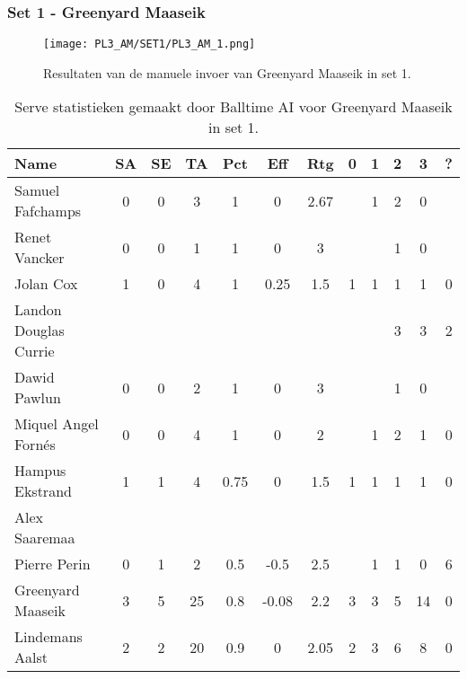 \subsubsection{Set 1 - Greenyard Maaseik}
\label{sec:PL3_Greenyard1}
\begin{figure}
  \centering
  \texttt{[image: PL3\_AM/SET1/PL3\_AM\_1.png]}
  \caption{\label{fig:PL3_AM_1}Resultaten van de manuele invoer van Greenyard Maaseik in set 1.}
\end{figure}

\begin{table}[ht!]
  \centering
  \scriptsize
  \begin{tabular}{|l|c|c|c|c|c|c|c|c|c|c|c|} \hline
    \textbf{Name} & SA & SE & TA & Pct & Eff & Rtg & 0 & 1 & 2 & 3 & ? \\ \hline
    Samuel Fafchamps & 0 & 0 & 3 & 1 & 0 & 2.67 &   & 1 & 2 & 0 &   \\
    Renet Vancker & 0 & 0 & 1 & 1 & 0 & 3 &   &   & 1 & 0 &   \\
    Jolan Cox & 1 & 0 & 4 & 1 & 0.25 & 1.5 & 1 & 1 & 1 & 1 & 0 \\
    Landon Douglas Currie &   &   &   &   &   &   &   &   & 3 & 3 & 2 \\
    Dawid Pawlun & 0 & 0 & 2 & 1 & 0 & 3 &   &   & 1 & 0 &   \\
    Miquel Angel Fornés & 0 & 0 & 4 & 1 & 0 & 2 &   & 1 & 2 & 1 & 0 \\
    Hampus Ekstrand & 1 & 1 & 4 & 0.75 & 0 & 1.5 & 1 & 1 & 1 & 1 & 0 \\
    Alex Saaremaa &   &   &   &   &   &   &   &   &   &   &   \\
    Pierre Perin & 0 & 1 & 2 & 0.5 & -0.5 & 2.5 &   & 1 & 1 & 0 & 6 \\
    Greenyard Maaseik & 3 & 5 & 25 & 0.8 & -0.08 & 2.2 & 3 & 3 & 5 & 14 & 0 \\
    Lindemans Aalst & 2 & 2 & 20 & 0.9 & 0 & 2.05 & 2 & 3 & 6 & 8 & 0 \\ \hline
  \end{tabular}
  \caption[Serve statistieken gemaakt door Balltime AI voor Greenyard Maaseik in set 1]{\label{tab:PL3ServeMaaseik1}Serve statistieken gemaakt door Balltime AI voor Greenyard Maaseik in set 1.}
\end{table}

